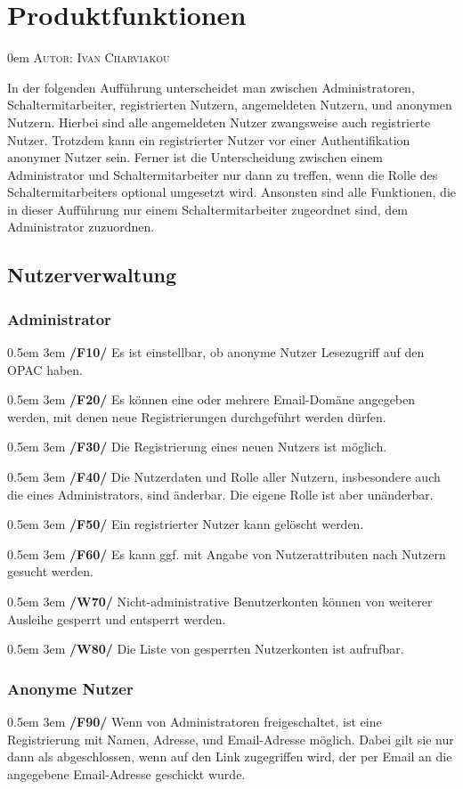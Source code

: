 \documentclass{article}
\makeatletter
\newcommand{\sectionauthor}[1]{
	{\parindent 0em \large \scshape Autor: #1 \par \nobreak \vspace*{2em}}
	\@afterheading
}
\newcommand{\specification}[3]{
	{\parindent 0.5em \hangindent 3em \hypertarget{spec:#1:#2}{\textbf{/#1#2/}} #3 \par \nobreak \vspace*{0.5em}}
}
\makeatother
\begin{document}
\newpage

\section{Produktfunktionen} %
\sectionauthor{Ivan Charviakou}
In der folgenden Aufführung unterscheidet man zwischen Administratoren, Schaltermitarbeiter, registrierten Nutzern, angemeldeten Nutzern, und anonymen Nutzern.
Hierbei sind alle angemeldeten Nutzer zwangsweise auch registrierte Nutzer. Trotzdem kann ein registrierter Nutzer vor einer Authentifikation anonymer Nutzer sein.
Ferner ist die Unterscheidung zwischen einem Administrator und Schaltermitarbeiter nur dann zu treffen, wenn die Rolle des Schaltermitarbeiters optional umgesetzt wird.
Ansonsten sind alle Funktionen, die in dieser Aufführung nur einem Schaltermitarbeiter zugeordnet sind, dem Administrator zuzuordnen.
	\subsection{Nutzerverwaltung}
		\subsubsection{Administrator}
			\specification{F}{10}{Es ist einstellbar, ob anonyme Nutzer Lesezugriff auf den OPAC haben.}
			\specification{F}{20}{Es können eine oder mehrere Email-Domäne angegeben werden, mit denen neue Registrierungen durchgeführt werden dürfen.}
			\specification{F}{30}{Die Registrierung eines neuen Nutzers ist möglich.}
			\specification{F}{40}{Die Nutzerdaten und Rolle aller Nutzern, insbesondere auch die eines Administrators, sind änderbar. Die eigene Rolle ist aber unänderbar. }
			\specification{F}{50}{Ein registrierter Nutzer kann gelöscht werden.}
			\specification{F}{60}{Es kann ggf. mit Angabe von Nutzerattributen nach Nutzern gesucht werden.}
			\specification{W}{70}{Nicht-administrative Benutzerkonten können von weiterer Ausleihe gesperrt und entsperrt werden.}
			\specification{W}{80}{Die Liste von gesperrten Nutzerkonten ist aufrufbar.}
		\subsubsection{Anonyme Nutzer}
			\specification{F}{90}{Wenn von Administratoren freigeschaltet, ist eine Registrierung mit Namen, Adresse, und Email-Adresse möglich. 
				Dabei gilt sie nur dann als abgeschlossen, wenn auf den Link zugegriffen wird, der per Email an die angegebene Email-Adresse geschickt wurde. }
\end{document}

